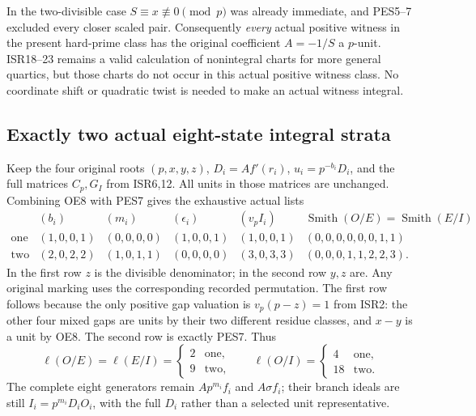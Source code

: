 \documentclass[11pt]{article}
\begin{document}
In the two-divisible case $S\equiv x\not\equiv0\pmod p$ was
already immediate, and PES5--7 excluded every closer scaled pair.
Consequently \emph{every} actual positive witness in the present
hard-prime class has the original coefficient $A=-1/S$ a $p$-unit.
ISR18--23 remains a valid calculation of nonintegral charts for more
general quartics, but those charts do not occur in this actual
positive witness class. No coordinate shift or quadratic twist is
needed to make an actual witness integral.

\subsection{Exactly two actual eight-state integral strata}
Keep the four original roots $(p,x,y,z)$, $D_i=Af'(r_i)$,
$u_i=p^{-b_i}D_i$, and the full matrices $C_p,G_I$ from ISR6,12.
All units in those matrices are unchanged. Combining OE8 with
PES7 gives the exhaustive actual lists
\begin{equation}
 \begin{array}{c|c|c|c|c|c}
 & (b_i)&(m_i)&(\epsilon_i)&(v_pI_i)&
       \operatorname{Smith}(O/E)=\operatorname{Smith}(E/I)\\\hline
 \text{one}&(1,0,0,1)&(0,0,0,0)&(1,0,0,1)&(1,0,0,1)&
                  (0,0,0,0,0,0,1,1)\\
 \text{two}&(2,0,2,2)&(1,0,1,1)&(0,0,0,0)&(3,0,3,3)&
                  (0,0,0,1,1,2,2,3).
 \end{array}                                            \tag{OE9}
\end{equation}
In the first row $z$ is the divisible denominator; in the second
row $y,z$ are. Any original marking uses the corresponding recorded
permutation. The first row follows because the only positive gap
valuation is $v_p(p-z)=1$ from ISR2: the other four mixed gaps are
units by their two different residue classes, and $x-y$ is a unit
by OE8. The second row is exactly PES7. Thus
\begin{equation}
 \ell(O/E)=\ell(E/I)=\begin{cases}2&\text{one},\\9&\text{two},\end{cases}
 \qquad \ell(O/I)=\begin{cases}4&\text{one},\\18&\text{two}.
                      \end{cases}                      \tag{OE10}
\end{equation}
The complete eight generators remain $Ap^{m_i}f_i$ and
$A\sigma f_i$; their branch ideals are still
$I_i=p^{m_i}D_iO_i$, with the full $D_i$ rather than a selected
unit representative.
\end{document}
